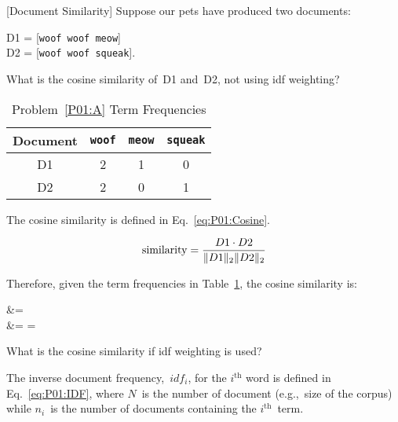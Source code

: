 \begin{problem}
   \textnormal{[Document Similarity]} Suppose our pets have produced two documents:

  D1 = [\texttt{woof woof meow}] \\ D2 = [\texttt{woof woof squeak}].
\end{problem}

\begin{subproblem}\label{P01:A}
   What is the cosine similarity of~D1 and~D2, not using idf weighting?
\end{subproblem}

  \begin{table}[h]
    \centering
    \caption{Problem~\ref{P01:A} Term Frequencies}\label{tab:P01:TermFreq}
    \begin{tabular}{|c|c|c|c|}
      \hline
      \textbf{Document} & \texttt{woof} & \texttt{meow} & \texttt{squeak} \\\hline\hline
      D1                & 2             & 1             & 0 \\\hline
      D2                & 2             & 0             & 1 \\\hline
    \end{tabular}
  \end{table}

The cosine similarity is defined in Eq.~\eqref{eq:P01:Cosine}.

\begin{equation}\label{eq:P01:Cosine}
  \text{similarity} = \frac{D1 \cdot D2}{\lVert D1\rVert_{2}\lVert D2\rVert_{2}}
\end{equation}

\noindent
Therefore, given the term frequencies in Table~\ref{tab:P01:TermFreq}, the cosine similarity is:

\begin{aligncustom}
   &=  \\
                    &=  =  
\end{aligncustom}

\begin{subproblem}\label{P01:B}
   What is the cosine similarity if idf weighting is used?
\end{subproblem}

The inverse document frequency,~$idf_i$, for the $i^{\text{th}}$ word is defined in Eq.~\eqref{eq:P01:IDF}, where $N$~is the number of document (e.g.,~size of the corpus) while $n_i$~is the number of documents containing the $i^{\text{th}}$~term.

